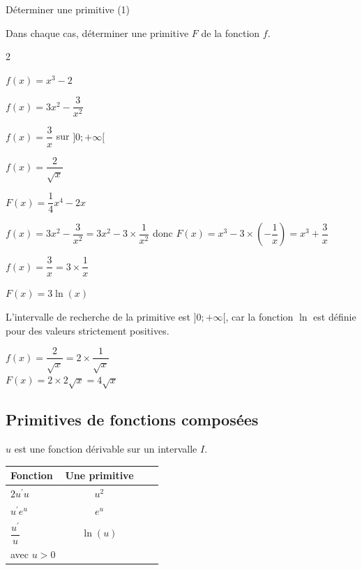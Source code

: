 \begin{bmethodet}{Déterminer une primitive (1)}
	
	Dans chaque cas, déterminer une primitive $F$ de la fonction $f$.
	\begin{multicols}{2}
		\begin{enumMet}
		\item $f(x)=x^{3}-2$
		\item $f(x)=3 x^{2}-\dfrac{3}{x^{2}}$
		\item $f(x)=\dfrac{3}{x}$ sur $] 0 ;+\infty[$
		\item $f(x)=\dfrac{2}{\sqrt{x}}$
	\end{enumMet}
	\end{multicols}
	
	
	\begin{enumMet}
		\item $F(x)=\dfrac{1}{4} x^{4}-2 x$
		\item $f(x)=3 x^{2}-\dfrac{3}{x^{2}}=3 x^{2}-3 \times \dfrac{1}{x^{2}}$ donc $F(x)=x^{3}-3 \times\left(-\dfrac{1}{x}\right)=x^{3}+\dfrac{3}{x}$
		\item $f(x)=\dfrac{3}{x}=3 \times \dfrac{1}{x}$
		
		$F(x)=3 \ln (x)$
		
		\begin{brmq}
			L'intervalle de recherche de la primitive est $] 0 ;+\infty[$, car la fonction $\ln$ est définie pour des valeurs strictement positives.
		\end{brmq}
		\item $f(x)=\dfrac{2}{\sqrt{x}}=2 \times \dfrac{1}{\sqrt{x}}$\\
		$F(x)=2 \times 2 \sqrt{x}=4 \sqrt{x}$
	\end{enumMet}	
\end{bmethodet}

\subsection{Primitives de fonctions composées}
$u$ est une fonction dérivable sur un intervalle $I$.

\begin{center}
	\begin{tabular}{|Xc|Xc|}
		\hline
		Fonction & Une primitive \\
		\hline
		$2 u^{\prime} u$ & $u^{2}$ \\
		\hline
		$u^{\prime} e^{u}$ & $e^{u}$ \\
		\hline
		$\dfrac{u^{\prime}}{u}$ & $\ln (u)$ \\
		avec $u>0$ &  \\
		\hline
	\end{tabular}
\end{center}


